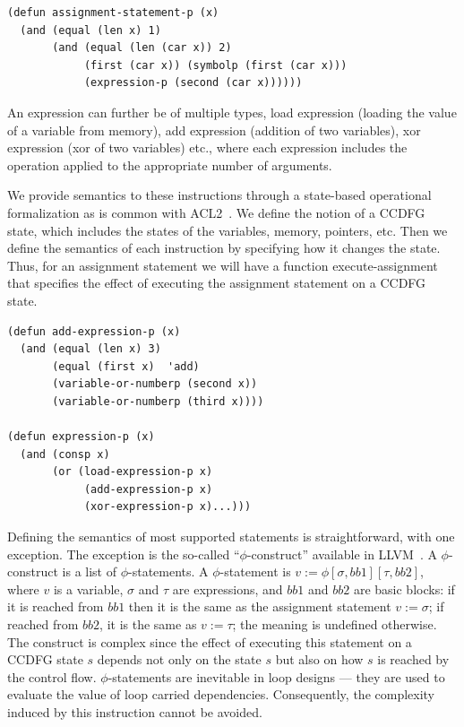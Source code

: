 \small
\begin{verbatim}
(defun assignment-statement-p (x)
  (and (equal (len x) 1)
       (and (equal (len (car x)) 2)
            (first (car x)) (symbolp (first (car x)))
            (expression-p (second (car x))))))
\end{verbatim}
\normalsize

An expression can further be of multiple types, %
load
expression (loading the value of a variable from memory), add
expression (addition of two variables), xor expression (xor of two variables)
etc., where each expression includes the operation applied to the
appropriate number of arguments.

We provide semantics to these instructions through a
state-based operational formalization as is common with
ACL2~\cite{liu}. We define the notion of a CCDFG state, which includes
the states of the variables, memory, pointers, etc.  Then we
define the semantics of each instruction by specifying how
it changes the state.  Thus, for an assignment statement we
will have a function execute-assignment that specifies
the effect of executing the assignment statement on a CCDFG
state.

\small
\begin{verbatim}
(defun add-expression-p (x)
  (and (equal (len x) 3)
       (equal (first x)  'add)
       (variable-or-numberp (second x))
       (variable-or-numberp (third x))))

(defun expression-p (x)
  (and (consp x)
       (or (load-expression-p x) 
       		(add-expression-p x) 
       		(xor-expression-p x)...)))
\end{verbatim}
\normalsize

Defining the semantics of most supported statements is
straightforward, with one exception.  The exception is the
so-called ``$\phi$-construct'' available in LLVM~\cite{llvmphi}. 
A
$\phi$-construct is a list of $\phi$-statements.  A
$\phi$-statement is $v := \phi [\sigma, bb1] [\tau, bb2]$,
where $v$ is a variable, $\sigma$ and $\tau$ are
expressions, and $bb1$ and $bb2$ are basic blocks: if it is
reached from $bb1$ then it is the same as the assignment
statement $v := \sigma$; if reached from $bb2$, it is the
same as $v := \tau$; the meaning is undefined otherwise. The
construct is complex since the effect of executing this
statement on a CCDFG state $s$ depends not only on the state
$s$ but also on how $s$ is reached by the control flow.
$\phi$-statements are inevitable in loop designs ---
they are used to evaluate the value of loop carried dependencies.
Consequently, the complexity induced
by this instruction cannot be avoided.

